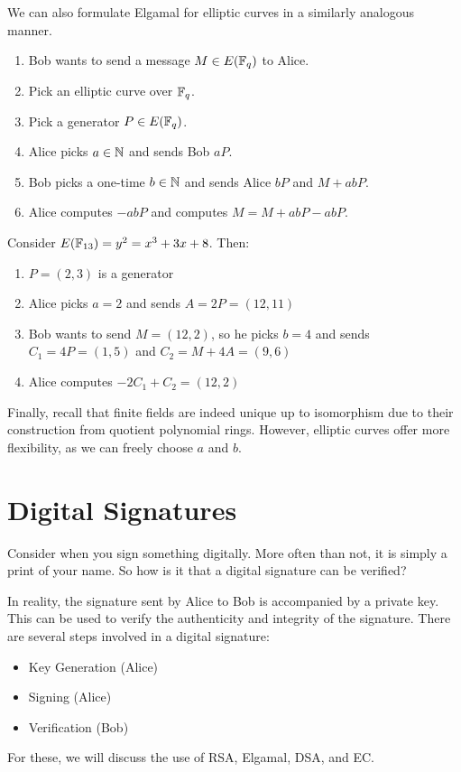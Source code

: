 \documentclass{article}
\begin{document}
\newpage
We can also formulate Elgamal for elliptic curves in a similarly analogous manner.
\begin{enumerate}
    \item Bob wants to send a message $ M \in E(\mathbb{F}_{q}) $ to Alice.
    \item Pick an elliptic curve over $ \mathbb{F}_{q} $.
    \item Pick a generator $ P \in E(\mathbb{F}_{q}) $.
    \item Alice picks $ a \in \mathbb{N} $ and sends Bob $ aP $.
    \item Bob picks a one-time $ b \in \mathbb{N} $ and sends Alice $ bP $ and $ M + abP $.
    \item Alice computes $ -abP $ and computes $ M = M + abP - abP $.
\end{enumerate}

\begin{xmp}[source=Primary Source Material]
    Consider $ E(\mathbb{F}_{13}) = y^{2} = x^{3} + 3x + 8 $. Then:
    \begin{enumerate}
        \item $ P = (2, 3) $ is a generator
        \item Alice picks $ a = 2 $ and sends $ A = 2P = (12, 11) $
        \item Bob wants to send $ M = (12, 2) $, so he picks $ b = 4 $ and sends
            $ C_{1} = 4P = (1, 5) $ and $ C_{2} = M + 4A = (9, 6) $
        \item Alice computes $ -2C_{1} + C_{2} = (12, 2) $
    \end{enumerate}
\end{xmp}

Finally, recall that finite fields are indeed unique up to isomorphism due to their construction
from quotient polynomial rings.
However, elliptic curves offer more flexibility, as we can freely choose $ a $ and $ b $.

\newpage
\section{Digital Signatures}

Consider when you sign something digitally.
More often than not, it is simply a print of your name.
So how is it that a digital signature can be verified?

In reality, the signature sent by Alice to Bob is accompanied by a private key.
This can be used to verify the authenticity and integrity of the signature.
There are several steps involved in a digital signature:
\begin{itemize}
    \item Key Generation (Alice)
    \item Signing (Alice)
    \item Verification (Bob)
\end{itemize}
For these, we will discuss the use of RSA, Elgamal, DSA, and EC.
\end{document}
